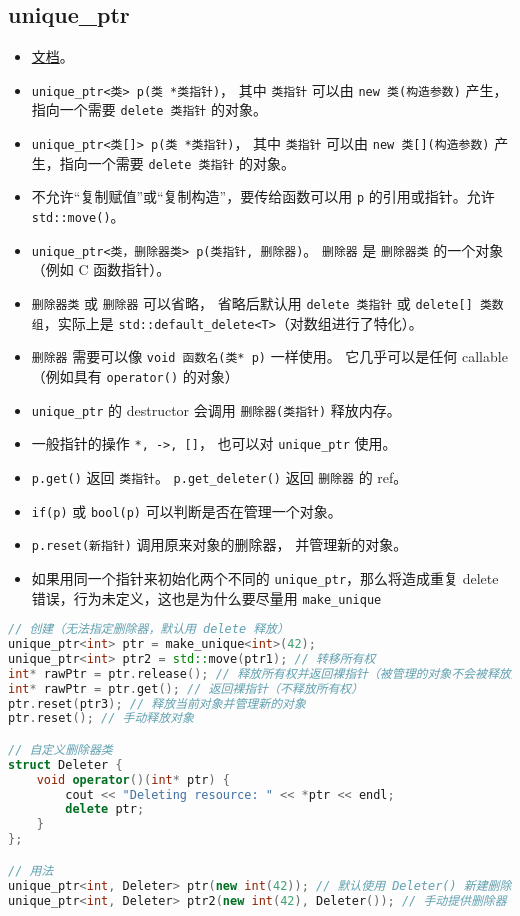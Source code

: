 
\begin{issues}
\issueDraft
\end{issues}

\subsection{unique\_ptr}
\begin{itemize}
\item \href{https://en.cppreference.com/w/cpp/memory/unique_ptr}{文档}。
\item \verb`unique_ptr<类> p(类 *类指针)`， 其中 \verb`类指针` 可以由 \verb`new 类(构造参数)` 产生，指向一个需要 \verb`delete 类指针` 的对象。
\item \verb`unique_ptr<类[]> p(类 *类指针)`， 其中 \verb`类指针` 可以由 \verb`new 类[](构造参数)` 产生，指向一个需要 \verb`delete 类指针` 的对象。
\item 不允许“复制赋值”或“复制构造”，要传给函数可以用 \verb`p` 的引用或指针。允许 \verb`std::move()`。
\item \verb`unique_ptr<类，删除器类> p(类指针, 删除器)`。 \verb`删除器` 是 \verb`删除器类` 的一个对象（例如 C 函数指针）。
\item \verb`删除器类` 或 \verb`删除器` 可以省略， 省略后默认用 \verb`delete 类指针` 或 \verb`delete[] 类数组`，实际上是 \verb`std::default_delete<T>`（对数组进行了特化）。
\item \verb`删除器` 需要可以像 \verb`void 函数名(类* p)` 一样使用。 它几乎可以是任何 callable（例如具有 \verb`operator()` 的对象）
\item \verb`unique_ptr` 的 destructor 会调用 \verb`删除器(类指针)` 释放内存。
\item 一般指针的操作 \verb`*, ->, []`， 也可以对 \verb`unique_ptr` 使用。
\item \verb`p.get()` 返回 \verb`类指针`。 \verb`p.get_deleter()` 返回 \verb`删除器` 的 ref。
\item \verb`if(p)` 或 \verb`bool(p)` 可以判断是否在管理一个对象。
\item \verb`p.reset(新指针)` 调用原来对象的删除器， 并管理新的对象。
\item 如果用同一个指针来初始化两个不同的 \verb`unique_ptr`，那么将造成重复 delete 错误，行为未定义，这也是为什么要尽量用 \verb`make_unique`
\end{itemize}
\begin{lstlisting}[language=cpp]
// 创建（无法指定删除器，默认用 delete 释放）
unique_ptr<int> ptr = make_unique<int>(42);
unique_ptr<int> ptr2 = std::move(ptr1); // 转移所有权
int* rawPtr = ptr.release(); // 释放所有权并返回裸指针（被管理的对象不会被释放）
int* rawPtr = ptr.get(); // 返回裸指针（不释放所有权）
ptr.reset(ptr3); // 释放当前对象并管理新的对象
ptr.reset(); // 手动释放对象

// 自定义删除器类
struct Deleter {
    void operator()(int* ptr) {
        cout << "Deleting resource: " << *ptr << endl;
        delete ptr;
    }
};

// 用法
unique_ptr<int, Deleter> ptr(new int(42)); // 默认使用 Deleter() 新建删除器
unique_ptr<int, Deleter> ptr2(new int(42), Deleter()); // 手动提供删除器
\end{lstlisting}


